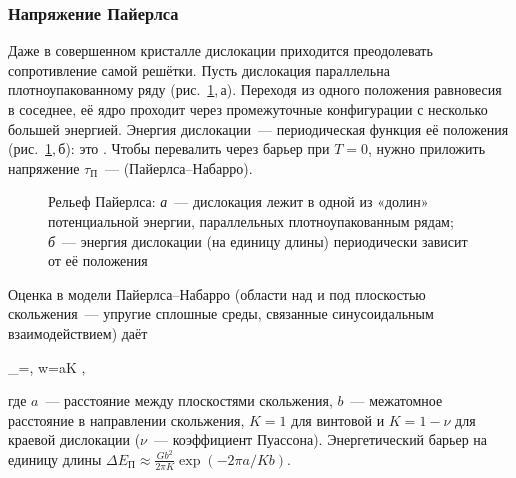 \subsubsection{Напряжение Пайерлса}

Даже в совершенном кристалле дислокации приходится преодолевать
сопротивление самой решётки. Пусть дислокация параллельна
плотноупакованному ряду (рис.~\ref{fig:peierls},\,а). Переходя из одного
положения равновесия в соседнее, её ядро проходит через промежуточные
конфигурации с несколько большей энергией. Энергия дислокации~—
периодическая функция её положения (рис.~\ref{fig:peierls},\,б): это
. Чтобы перевалить через барьер при $T=0$, нужно
приложить напряжение $\tau_\text{П}$~— 
(Пайерлса--Набарро).

\begin{figure}[ht]
\centering
\begin{subfigure}[b]{0.4\textwidth}\centering
{}
\caption{}
\end{subfigure}\hfill
\begin{subfigure}[b]{0.56\textwidth}\centering
{}
\caption{}
\end{subfigure}
\caption{Рельеф Пайерлса: \textit{а}~— дислокация лежит в одной из
«долин» потенциальной энергии, параллельных плотноупакованным рядам;
\textit{б}~— энергия дислокации (на единицу длины) периодически
зависит от её положения}
\label{fig:peierls}
\end{figure}

Оценка в модели Пайерлса--Набарро (области над и под плоскостью
скольжения~— упругие сплошные среды, связанные синусоидальным
взаимодействием) даёт
\begin{keyeq}\label{eq:peierls}
\tau_\approx{}=,
\qquad w=\frac aK ,
\end{keyeq}
где $a$~— расстояние между плоскостями скольжения, $b$~— межатомное
расстояние в направлении скольжения, $K=1$ для винтовой и $K=1-\nu$ для
краевой дислокации ($\nu$~— коэффициент Пуассона). Энергетический барьер
на единицу длины $\Delta E_\text{П}\approx\frac{Gb^2}{2\pi K}\exp(-2\pi
a/Kb)$.

